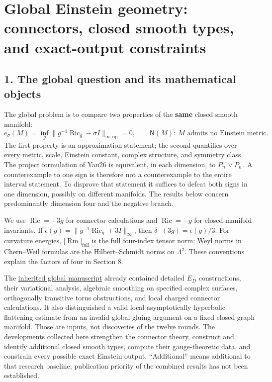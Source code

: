 \documentclass[
  english,
]{article}
\author{}
\date{}
\begin{document}
\hypertarget{global-einstein-geometry-connectors-closed-smooth-types-and-exact-output-constraints}{%
\section{Global Einstein geometry: connectors, closed smooth types, and
exact-output
constraints}\label{global-einstein-geometry-connectors-closed-smooth-types-and-exact-output-constraints}}

\hypertarget{the-global-question-and-its-mathematical-objects}{%
\subsection{1. The global question and its mathematical
objects}\label{the-global-question-and-its-mathematical-objects}}

The global problem is to compare two properties of the \textbf{same}
closed smooth manifold: \[
 e_\sigma(M)=\inf_g\|g^{-1}\operatorname{Ric}_g-\sigma I\|_{\infty,\mathrm{op}}=0,
 \qquad
 \mathsf N(M):\ M\text{ admits no Einstein metric}.
\] The first property is an approximation statement; the second
quantifies over every metric, scale, Einstein constant, complex
structure, and symmetry class. The project formulation of Yau26 is
equivalent, in each dimension, to \(P_n^+\lor P_n^-\). A counterexample
to one sign is therefore not a counterexample to the entire interval
statement. To disprove that statement it suffices to defeat both signs
in one dimension, possibly on different manifolds. The results below
concern predominantly dimension four and the negative branch.

We use \(\operatorname{Ric}=-3g\) for connector calculations and
\(\operatorname{Ric}=-g\) for closed-manifold invariants. If
\(\epsilon(g)=\|g^{-1}\operatorname{Ric}_g+3I\|_\infty\), then
\(\delta_-(3g)=\epsilon(g)/3\). For curvature energies,
\(|\operatorname{Rm}|_{\mathrm{full}}\) is the full four-index tensor
norm; Weyl norms in Chern--Weil formulas are the Hilbert--Schmidt norms
on \(\Lambda^2\). These conventions explain the factors of four in
Section 8.

The \href{../baseline/research/20260916_global.tex}{inherited global
manuscript} already contained detailed \(E_D\) constructions, their
variational analysis, algebraic smoothing on specified complex surfaces,
orthogonally transitive torus obstructions, and local charged connector
calculations. It also distinguished a valid local asymptotically
hyperbolic flattening estimate from an invalid global gluing argument on
a fixed closed graph manifold. Those are inputs, not discoveries of the
twelve rounds. The developments collected here strengthen the connector
theory, construct and identify additional closed smooth types, compute
their gauge-theoretic data, and constrain every possible exact Einstein
output. ``Additional'' means additional to that research baseline;
publication priority of the combined results has not been established.
\end{document}
